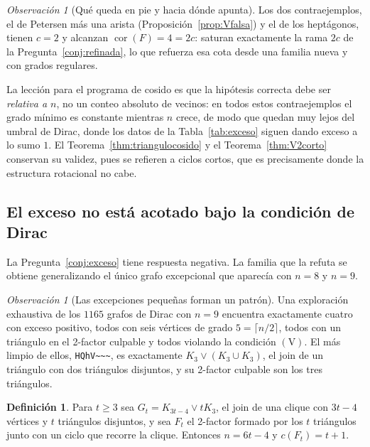 \documentclass[11pt,a4paper]{article}
\theoremstyle{definition}
\newtheorem{definicion}[teorema]{Definición}
\theoremstyle{remark}
\newtheorem{observacion}[teorema]{Observación}
\begin{document}
\begin{observacion}[Qué queda en pie y hacia dónde apunta]\label{obs:redireccion}
Los dos contraejemplos, el de Petersen más una arista (Proposición~\ref{prop:Vfalsa}) y el de los heptágonos, tienen $c=2$ y alcanzan $\operatorname{cor}(F)=4=2c$: saturan exactamente la rama $2c$ de la Pregunta~\ref{conj:refinada}, lo que refuerza esa cota desde una familia nueva y con grados regulares.

La lección para el programa de cosido es que la hipótesis correcta debe ser \emph{relativa a $n$}, no un conteo absoluto de vecinos: en todos estos contraejemplos el grado mínimo es constante mientras $n$ crece, de modo que quedan muy lejos del umbral de Dirac, donde los datos de la Tabla~\ref{tab:exceso} siguen dando exceso a lo sumo $1$. El Teorema~\ref{thm:triangulocosido} y el Teorema~\ref{thm:V2corto} conservan su validez, pues se refieren a ciclos cortos, que es precisamente donde la estructura rotacional no cabe.
\end{observacion}



\subsection{El exceso no está acotado bajo la condición de Dirac}\label{sub:excesofalso}

La Pregunta~\ref{conj:exceso} tiene respuesta negativa. La familia que la refuta se obtiene generalizando el único grafo excepcional que aparecía con $n=8$ y $n=9$.

\begin{observacion}[Las excepciones pequeñas forman un patrón]\label{obs:excepciones9}
Una exploración exhaustiva de los $1165$ grafos de Dirac con $n=9$ encuentra exactamente cuatro con exceso positivo, todos con seis vértices de grado $5=\lceil n/2\rceil$, todos con un triángulo en el 2-factor culpable y todos violando la condición $(\mathrm{V})$. El más limpio de ellos, \verb|HQhV~~~|, es exactamente $K_3\vee(K_3\cup K_3)$, el join de un triángulo con dos triángulos disjuntos, y su 2-factor culpable son los tres triángulos.
\end{observacion}

\begin{definicion}
Para $t\ge3$ sea $G_t=K_{3t-4}\vee tK_3$, el join de una clique con $3t-4$ vértices y $t$ triángulos disjuntos, y sea $F_t$ el 2-factor formado por los $t$ triángulos junto con un ciclo que recorre la clique. Entonces $n=6t-4$ y $c(F_t)=t+1$.
\end{definicion}
\end{document}
